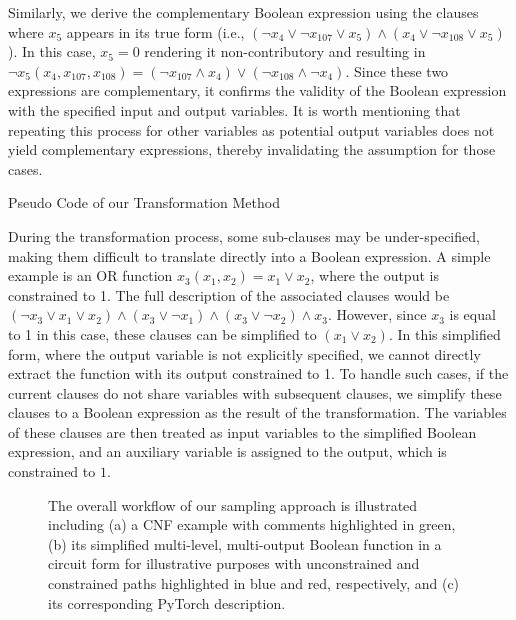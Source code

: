 Similarly, we derive the complementary Boolean expression using the clauses where $x_5$ appears in its true form (i.e., $(\neg x_4 \vee \neg x_{107} \vee x_5) \wedge (x_4 \vee \neg x_{108} \vee x_5)$). In this case, $x_5 = 0$ rendering it non-contributory and resulting in $\neg x_5(x_4, x_{107}, x_{108}) = (\neg x_{107} \wedge x_4) \vee (\neg x_{108} \wedge \neg x_4)$. Since these two expressions are complementary, it confirms the validity of the Boolean expression with the specified input and output variables. It is worth mentioning that repeating this process for other variables as potential output variables does not yield complementary expressions, thereby invalidating the assumption for those cases.  


\begin{algorithm}[t]
\caption{Pseudo Code of our Transformation Method}

\label{alg1}
\end{algorithm}

During the transformation process, some sub-clauses may be under-specified, making them difficult to translate directly into a Boolean expression. A simple example is an OR function $x_3(x_1, x_2) = x_1 \vee x_2$, where the output is constrained to 1. The full description of the associated clauses would be $(\neg x_3 \vee x_1 \vee x_2) \wedge (x_3 \vee \neg x_1) \wedge (x_3 \vee \neg x_2) \wedge x_3$. However, since $x_3$ is equal to 1 in this case, these clauses can be simplified to $(x_1 \vee x_2)$. In this simplified form, where the output variable is not explicitly specified, we cannot directly extract the function with its output constrained to 1. To handle such cases, if the current clauses do not share variables with subsequent clauses, we simplify these clauses to a Boolean expression as the result of the transformation. The variables of these clauses are then treated as input variables to the simplified Boolean expression, and an auxiliary variable is assigned to the output, which is constrained to $1$.

\begin{figure*}
    \centering
    \scalebox{0.85}{}
    \vspace{-0.25cm}
    \caption{The overall workflow of our sampling approach is illustrated including (a) a CNF example with comments highlighted in green, (b) its simplified multi-level, multi-output Boolean function in a circuit form for illustrative purposes with unconstrained and constrained paths highlighted in blue and red, respectively, and (c) its corresponding PyTorch description. }
    \label{fig1}
    \vspace{-0.5cm}
\end{figure*}


